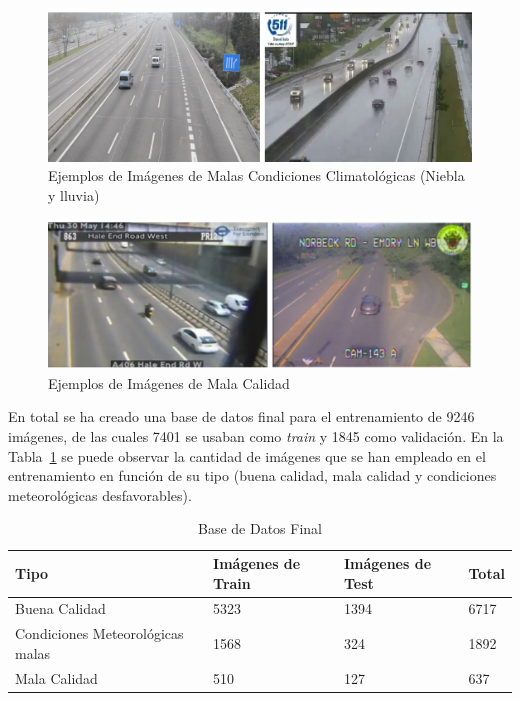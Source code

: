 \begin{figure}[H] 
\begin{center}
	\includegraphics[width=1\textwidth]{figures/Experimentos/malas_condiciones.png}
   \caption{Ejemplos de Imágenes de Malas Condiciones Climatológicas (Niebla y lluvia)}
	\label{fig.malas_condiciones}
\end{center}
\end{figure}

\begin{figure}[H] 
\begin{center}
	\includegraphics[width=1\textwidth]{figures/Experimentos/mala_calidad.png}
   \caption{Ejemplos de Imágenes de Mala Calidad}
	\label{fig.mala_calidad}
\end{center}
\end{figure}

En total se ha creado una base de datos final para el entrenamiento de 9246 imágenes, de las cuales 7401 se usaban como \textit{train} y 1845 como validación. En la Tabla~\ref{base_datos_final_train} se puede observar la cantidad de imágenes que se han empleado en el entrenamiento en función de su tipo (buena calidad, mala calidad y condiciones meteorológicas desfavorables).

\begin{table}[H]
\begin{center}
\begin{tabular}{|l|l|l|l|}
\hline
Tipo  & Imágenes de Train & Imágenes de Test & Total \\
\hline \hline
Buena Calidad & 5323 &  1394 & 6717 \\ \hline
Condiciones Meteorológicas malas & 1568 & 324 & 1892 \\ \hline
Mala Calidad & 510 & 127 & 637 \\ \hline
\end{tabular}
\caption{Base de Datos Final}
\label{base_datos_final_train}
\end{center}
\end{table}

